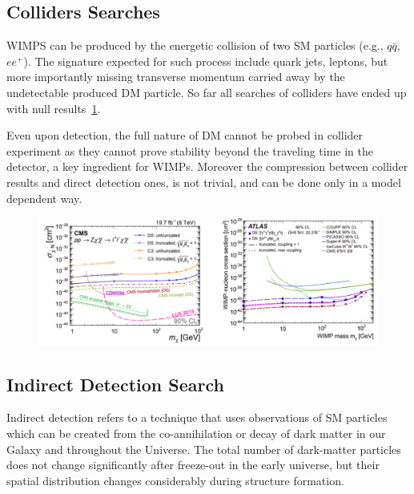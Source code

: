\subsection{Colliders Searches}
\label{subsec:collider}

WIMPS can be produced by the energetic collision of two SM particles (e.g., $q\bar{q}$, $ee^+$). The signature expected for such process include quark jets, leptons, but more importantly missing transverse momentum carried away by the undetectable produced DM particle. So far all searches of colliders have ended up with null results~\ref{fig:ColliderLimit}.  

Even upon detection, the full nature of DM cannot be probed in collider experiment as they cannot prove stability beyond the traveling time in the detector, a key ingredient for WIMPs. Moreover the compression between collider results and direct detection ones, is not trivial, and can be done only in a model dependent way.
\begin{figure}[]
	\centering
	\includegraphics[width=\textwidth]{figs/ColliderLimit.png}
	\label{fig:ColliderLimit}
\end{figure}  

\subsection{Indirect Detection Search}
\label{subsec:indirect}
Indirect detection refers to a technique that uses observations
of SM particles which can be created from the co-annihilation or decay of dark matter in our Galaxy and throughout the Universe. The total number of dark-matter particles does not change significantly after freeze-out in the early universe, but their spatial distribution changes considerably during structure formation. 

